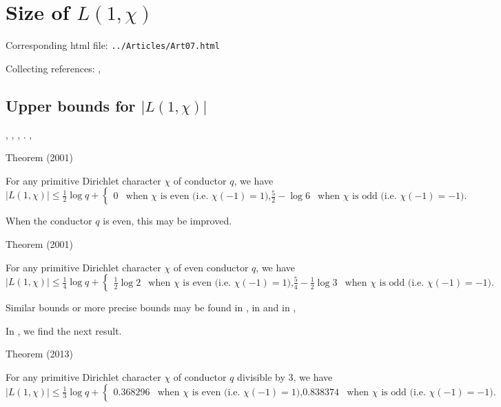 \chapter{   Size of $L(1,\chi)$}

Corresponding html file: \texttt{../Articles/Art07.html}









Collecting references:
\cite{Louboutin*93},


\section{Upper bounds for $|L(1,\chi)|$}


\cite{Louboutin*96},
\cite{Louboutin*98},
\cite{Granville-Soundararajan*02},
\cite{Granville-Soundararajan*04}.
\cite{Ramare*01},


\begin{thm}{Theorem (2001)}

For any primitive Dirichlet character $\chi$ of conductor $q$,
we have
$$
|L(1,\chi)|\le\tfrac12\log q
+
\begin{cases}
0&\text{when $\chi$ is even (i.e. $\chi(-1)=1$),}
\tfrac52-\log 6&\text{when $\chi$ is odd (i.e. $\chi(-1)=-1$).}
\end{cases}
$$
\end{thm}


When the conductor $q$ is even, this may be improved.
\begin{thm}{Theorem (2001)}

For any primitive Dirichlet character $\chi$ of even conductor $q$,
we have
$$
|L(1,\chi)|\le\tfrac14\log q
+
\begin{cases}
\tfrac12\log 2&\text{when $\chi$ is even (i.e. $\chi(-1)=1$),}
\tfrac54-\tfrac12\log 3&\text{when $\chi$ is odd (i.e. $\chi(-1)=-1$).}
\end{cases}
$$
\end{thm}


Similar bounds or more precise bounds may be found in
\cite{Louboutin*02},
in
\cite{Ramare*02-??}
and in
\cite{Louboutin*18},
\par 
In
\cite{Platt-Eddin*13},
we find the next result.
\begin{thm}{Theorem (2013)}

For any primitive Dirichlet character $\chi$ of conductor $q$
divisible by 3,
we have
$$
|L(1,\chi)|\le\tfrac13\log q
+
\begin{cases}
0.368296&\text{when $\chi$ is even (i.e. $\chi(-1)=1$),}
0.838374&\text{when $\chi$ is odd (i.e. $\chi(-1)=-1$).}
\end{cases}
$$
\end{thm}

